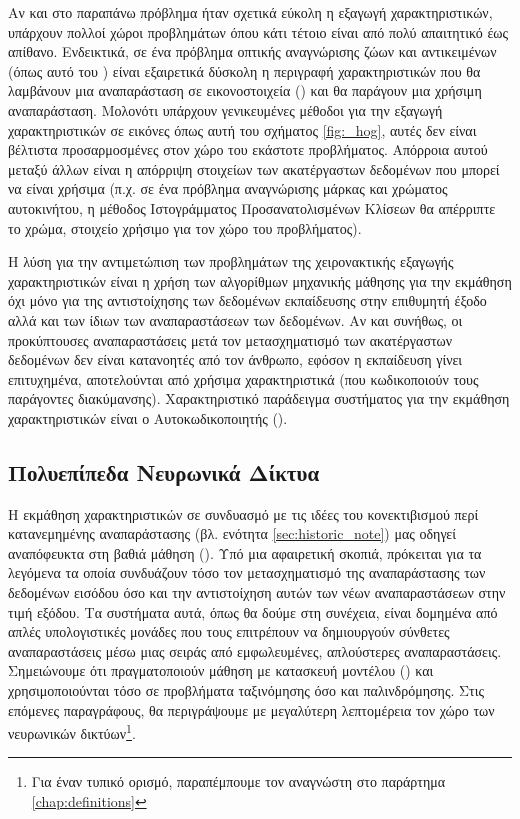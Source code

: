 Αν και στο παραπάνω πρόβλημα ήταν σχετικά εύκολη η  εξαγωγή χαρακτηριστικών, υπάρχουν πολλοί χώροι προβλημάτων όπου κάτι τέτοιο είναι από πολύ απαιτητικό έως απίθανο. Ενδεικτικά, σε ένα πρόβλημα οπτικής αναγνώρισης ζώων και αντικειμένων (όπως αυτό του \cite{krizhevsky2009learning}) είναι εξαιρετικά δύσκολη η περιγραφή χαρακτηριστικών που θα λαμβάνουν μια αναπαράσταση σε εικονοστοιχεία () και θα παράγουν μια χρήσιμη αναπαράσταση. Μολονότι υπάρχουν γενικευμένες μέθοδοι για την εξαγωγή χαρακτηριστικών σε εικόνες όπως αυτή του σχήματος \ref{fig:_hog}, αυτές δεν είναι βέλτιστα προσαρμοσμένες στον χώρο του εκάστοτε προβλήματος. Απόρροια αυτού μεταξύ άλλων είναι η απόρριψη στοιχείων των ακατέργαστων δεδομένων που μπορεί να είναι χρήσιμα (π.χ. σε ένα πρόβλημα αναγνώρισης μάρκας και χρώματος αυτοκινήτου, η μέθοδος Ιστογράμματος Προσανατολισμένων Κλίσεων θα απέρριπτε το χρώμα, στοιχείο χρήσιμο για τον χώρο του προβλήματος). \par

Η λύση για την αντιμετώπιση των προβλημάτων της χειρονακτικής εξαγωγής χαρακτηριστικών είναι η χρήση των αλγορίθμων μηχανικής μάθησης για την εκμάθηση όχι μόνο για της αντιστοίχησης των δεδομένων εκπαίδευσης στην επιθυμητή έξοδο αλλά και των ίδιων των αναπαραστάσεων των δεδομένων. Αν και συνήθως, οι προκύπτουσες αναπαραστάσεις μετά τον μετασχηματισμό των ακατέργαστων δεδομένων δεν είναι κατανοητές από τον άνθρωπο, εφόσον η εκπαίδευση γίνει επιτυχημένα, αποτελούνται από χρήσιμα χαρακτηριστικά (που κωδικοποιούν τους παράγοντες διακύμανσης).
Χαρακτηριστικό παράδειγμα συστήματος για την εκμάθηση χαρακτηριστικών είναι ο Αυτοκωδικοποιητής ().

\subsection{Πολυεπίπεδα Νευρωνικά Δίκτυα}

Η εκμάθηση χαρακτηριστικών σε συνδυασμό με τις ιδέες του κονεκτιβισμού περί κατανεμημένης αναπαράστασης (βλ. ενότητα \ref{sec:historic_note}) μας οδηγεί αναπόφευκτα στη βαθιά μάθηση (). Υπό μια αφαιρετική σκοπιά, πρόκειται για τα λεγόμενα  τα οποία συνδυάζουν τόσο τον μετασχηματισμό της αναπαράστασης των δεδομένων εισόδου όσο και την αντιστοίχηση αυτών των νέων αναπαραστάσεων στην τιμή εξόδου. Τα συστήματα αυτά, όπως θα δούμε στη συνέχεια, είναι δομημένα από απλές υπολογιστικές μονάδες που τους επιτρέπουν να δημιουργούν σύνθετες αναπαραστάσεις μέσω μιας σειράς από εμφωλευμένες, απλούστερες αναπαραστάσεις. Σημειώνουμε ότι πραγματοποιούν μάθηση με κατασκευή μοντέλου () και χρησιμοποιούνται τόσο σε προβλήματα ταξινόμησης όσο και παλινδρόμησης. Στις επόμενες παραγράφους, θα περιγράψουμε με μεγαλύτερη λεπτομέρεια τον χώρο των νευρωνικών δικτύων\footnote{Για έναν τυπικό ορισμό, παραπέμπουμε τον αναγνώστη στο παράρτημα \ref{chap:definitions}}.

